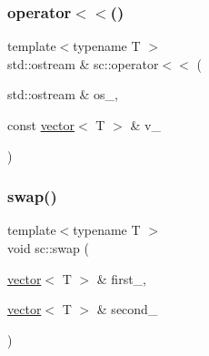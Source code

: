 \subsubsection{\texorpdfstring{operator$<$$<$()}{operator<<()}}
{\footnotesize\ttfamily template$<$typename T $>$ \\
std\+::ostream \& sc\+::operator$<$$<$ (\begin{DoxyParamCaption}\item[{std\+::ostream \&}]{os\+\_\+,  }\item[{const \hyperlink{classsc_1_1vector}{vector}$<$ T $>$ \&}]{v\+\_\+ }\end{DoxyParamCaption})}

\mbox{\label{namespacesc_ac8c8a40b2448b8d340e7d5019dc6fc70}} 
\subsubsection{\texorpdfstring{swap()}{swap()}}
{\footnotesize\ttfamily template$<$typename T $>$ \\
void sc\+::swap (\begin{DoxyParamCaption}\item[{\hyperlink{classsc_1_1vector}{vector}$<$ T $>$ \&}]{first\+\_\+,  }\item[{\hyperlink{classsc_1_1vector}{vector}$<$ T $>$ \&}]{second\+\_\+ }\end{DoxyParamCaption})}

